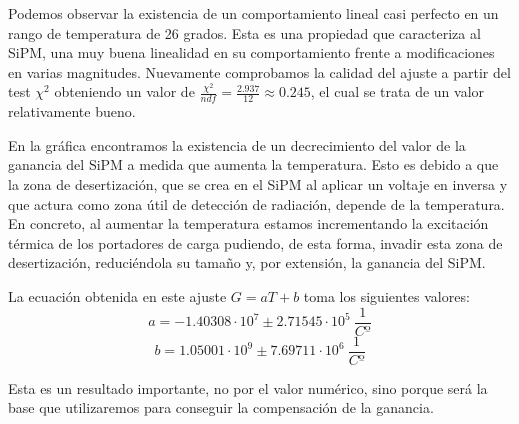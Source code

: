 \begin{itemize}
Podemos observar la existencia de un comportamiento lineal casi perfecto en un rango de temperatura de 26 grados. Esta es una propiedad que caracteriza al SiPM, una muy buena linealidad en su comportamiento frente a modificaciones en varias magnitudes. Nuevamente comprobamos la calidad del ajuste a partir del test $\chi^2$ obteniendo un valor de $\frac{\chi^2}{ndf}=\frac{2.937}{12}\approx 0.245$, el cual se trata de un valor relativamente bueno.

En la gráfica encontramos la existencia de un decrecimiento del valor de la ganancia del SiPM a medida que aumenta la temperatura. Esto es debido a que la zona de desertización, que se crea en el SiPM al aplicar un voltaje en inversa y que actura como zona útil de detección de radiación, depende de la temperatura. En concreto, al aumentar la temperatura estamos incrementando la excitación térmica de los portadores de carga pudiendo, de esta forma, invadir esta zona de desertización, reduciéndola su tamaño y, por extensión, la ganancia del SiPM.

La ecuación obtenida en este ajuste $G=aT+b$ toma los siguientes valores: 
\begin{equation}
a=-1.40308 \cdot 10^7 \pm 2.71545 \cdot 10^5~\frac{1}{Cº}
\label{ajustependientetemperatura}
\end{equation}
\begin{equation}
b=1.05001 \cdot 10^9 \pm 7.69711 \cdot 10^6 ~\frac{1}{Cº}
\label{ajusteordenadatemperatura}
\end{equation}


Esta es un resultado importante, no por el valor numérico, sino porque será la base que utilizaremos para conseguir la compensación de la ganancia.
\end{itemize}